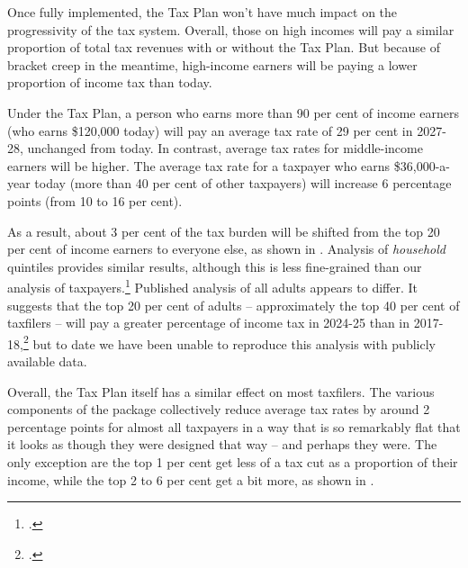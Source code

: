 \documentclass[submission]{grattan}\usepackage[]{graphicx}\usepackage[]{color}
\begin{document}
Once fully implemented, the Tax Plan won't have much impact on the progressivity of the tax system. Overall, those on high incomes will pay a similar proportion of total tax revenues with or without the Tax Plan. But because of bracket creep in the meantime, high-income earners will be paying a lower proportion of income tax than today.





Under the Tax Plan, a person who earns more than 90 per cent of income earners (who earns \$120,000 today) will pay an average tax rate of 29 per cent in 2027-28, unchanged from today. In contrast, average tax rates for middle-income earners will be higher. The average tax rate for a taxpayer who earns \$36,000-a-year today (more than 40 per cent of other taxpayers) will increase 6 percentage points (from 10 to 16 per cent).

As a result, about 3 per cent of the tax burden will be shifted from the top 20 per cent of income earners to everyone else, as shown in . Analysis of \emph{household} quintiles provides similar results, although this is less fine-grained than our analysis of taxpayers.\footcite{Phillips2018}
Published analysis of all adults appears to differ. It suggests that the top 20 per cent of adults -- approximately the top 40 per cent of taxfilers -- will pay a greater percentage of income tax in 2024-25 than in 2017-18,\footcite{Greber} but to date we have been unable to reproduce this analysis with publicly available data.

Overall, the Tax Plan itself has a similar effect on most taxfilers. The various components of the package collectively reduce average tax rates by around 2 percentage points for almost all taxpayers in a way that is so remarkably flat that it looks as though they were designed that way -- and perhaps they were. The only exception are the top 1 per cent get less of a tax cut as a proportion of their income, while the top 2 to 6 per cent get a bit more, as shown in .
\end{document}
